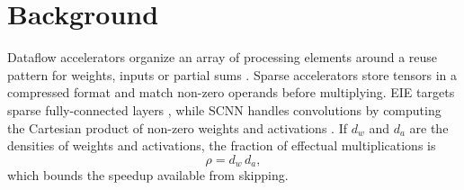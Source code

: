\chapter{Background}
\label{ch:background}

Dataflow accelerators organize an array of processing elements around a reuse pattern for
weights, inputs or partial sums \citep{chen2016eyeriss}. Sparse accelerators store tensors in a
compressed format and match non-zero operands before multiplying. EIE targets sparse
fully-connected layers \citep{han2016eie}, while SCNN handles convolutions by computing the
Cartesian product of non-zero weights and activations \citep{parashar2017}. If $d_w$ and $d_a$
are the densities of weights and activations, the fraction of effectual multiplications is
\begin{equation}
  \rho = d_w \, d_a ,
  \label{eq:density}
\end{equation}
which bounds the speedup available from skipping.
